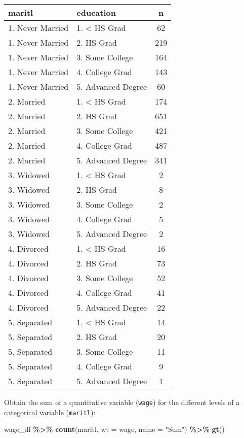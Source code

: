 \documentclass[
]{book}
\newenvironment{Shaded}{\begin{snugshade}}{\end{snugshade}}
\newcommand{\DataTypeTok}[1]{\textcolor[rgb]{0.13,0.29,0.53}{#1}}
\newcommand{\KeywordTok}[1]{\textcolor[rgb]{0.13,0.29,0.53}{\textbf{#1}}}
\newcommand{\NormalTok}[1]{#1}
\newcommand{\OperatorTok}[1]{\textcolor[rgb]{0.81,0.36,0.00}{\textbf{#1}}}
\newcommand{\StringTok}[1]{\textcolor[rgb]{0.31,0.60,0.02}{#1}}
\begin{document}
\captionsetup[table]{labelformat=empty,skip=1pt}
\begin{longtable}{llc}
\toprule
maritl & education & n \\ 
\midrule
1. Never Married & 1. < HS Grad & 62 \\ 
1. Never Married & 2. HS Grad & 219 \\ 
1. Never Married & 3. Some College & 164 \\ 
1. Never Married & 4. College Grad & 143 \\ 
1. Never Married & 5. Advanced Degree & 60 \\ 
2. Married & 1. < HS Grad & 174 \\ 
2. Married & 2. HS Grad & 651 \\ 
2. Married & 3. Some College & 421 \\ 
2. Married & 4. College Grad & 487 \\ 
2. Married & 5. Advanced Degree & 341 \\ 
3. Widowed & 1. < HS Grad & 2 \\ 
3. Widowed & 2. HS Grad & 8 \\ 
3. Widowed & 3. Some College & 2 \\ 
3. Widowed & 4. College Grad & 5 \\ 
3. Widowed & 5. Advanced Degree & 2 \\ 
4. Divorced & 1. < HS Grad & 16 \\ 
4. Divorced & 2. HS Grad & 73 \\ 
4. Divorced & 3. Some College & 52 \\ 
4. Divorced & 4. College Grad & 41 \\ 
4. Divorced & 5. Advanced Degree & 22 \\ 
5. Separated & 1. < HS Grad & 14 \\ 
5. Separated & 2. HS Grad & 20 \\ 
5. Separated & 3. Some College & 11 \\ 
5. Separated & 4. College Grad & 9 \\ 
5. Separated & 5. Advanced Degree & 1 \\ 
\bottomrule
\end{longtable}

Obtain the sum of a quantitative variable (\texttt{wage}) for the different levels of a categorical variable (\texttt{maritl}):

\begin{Shaded}
\begin{Highlighting}[]
\NormalTok{wage\_df }\OperatorTok{\%\textgreater{}\%}\StringTok{  }
\StringTok{  }\KeywordTok{count}\NormalTok{(maritl,}
        \DataTypeTok{wt =}\NormalTok{ wage,}
        \DataTypeTok{name =} \StringTok{"Sum"}\NormalTok{) }\OperatorTok{\%\textgreater{}\%}\StringTok{ }
\StringTok{  }\KeywordTok{gt}\NormalTok{()}
\end{Highlighting}
\end{Shaded}
\end{document}

